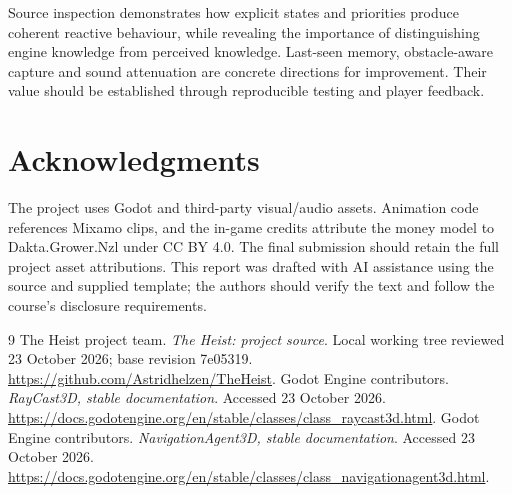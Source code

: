 \documentclass[fleqn,10pt]{SelfArx}
\begin{document}
Source inspection demonstrates how explicit states and priorities produce coherent reactive behaviour, while revealing the importance of distinguishing engine knowledge from perceived knowledge. Last-seen memory, obstacle-aware capture and sound attenuation are concrete directions for improvement. Their value should be established through reproducible testing and player feedback.

\section*{Acknowledgments}
The project uses Godot and third-party visual/audio assets. Animation code references Mixamo clips, and the in-game credits attribute the money model to Dakta.Grower.Nzl under CC BY 4.0. The final submission should retain the full project asset attributions. This report was drafted with AI assistance using the source and supplied template; the authors should verify the text and follow the course's disclosure requirements.

\begin{thebibliography}{9}
 The Heist project team. \emph{The Heist: project source}. Local working tree reviewed 23 October 2026; base revision 7e05319. \url{https://github.com/Astridhelzen/TheHeist}.
 Godot Engine contributors. \emph{RayCast3D, stable documentation}. Accessed 23 October 2026. \url{https://docs.godotengine.org/en/stable/classes/class_raycast3d.html}.
 Godot Engine contributors. \emph{NavigationAgent3D, stable documentation}. Accessed 23 October 2026. \url{https://docs.godotengine.org/en/stable/classes/class_navigationagent3d.html}.
\end{thebibliography}
\end{document}
